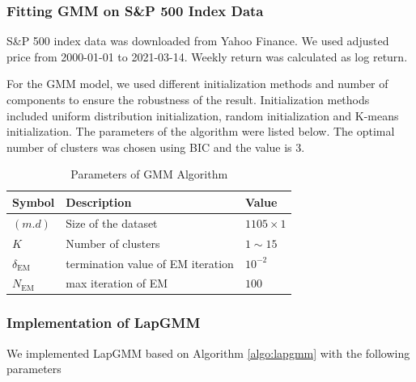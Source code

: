 \documentclass[10pt,journal,compsoc]{IEEEtran}
\begin{document}
        \subsubsection{Fitting GMM on S\&P 500 Index Data}
    
    S\&P 500 index data was downloaded from Yahoo Finance. We used adjusted price from 2000-01-01 to 2021-03-14. Weekly return was calculated as log return.
    
    For the GMM model, we used different initialization methods and number of components to ensure the robustness of the result. Initialization methods included uniform distribution initialization, random initialization and K-means initialization. The parameters of the algorithm were listed below. The optimal number of clusters was chosen using BIC and the value is 3.
    
    \begin{table}[H]
        \centering
        \begin{tabular}{|l|l|l|}
            \hline
            Symbol & Description & Value  \\
            \hline
            $(m.d)$ & Size of the dataset & $1105\times 1$\\ 
            \hline
            $K$ & Number of clusters & $1 \sim 15$\\
            \hline
            $\delta_{\mathrm{EM}}$ & termination value of EM iteration & $10^{-2}$\\
            \hline
            $N_{\mathrm{EM}}$ & max iteration of EM & $100$\\
            \hline
        \end{tabular}
        \caption{Parameters of GMM Algorithm}
        \label{tab:parameter-gmm}
    \end{table}
    
    \subsubsection{Implementation of LapGMM}
    
    We implemented LapGMM based on Algorithm \ref{algo:lapgmm} with the following parameters
    
\end{document}
